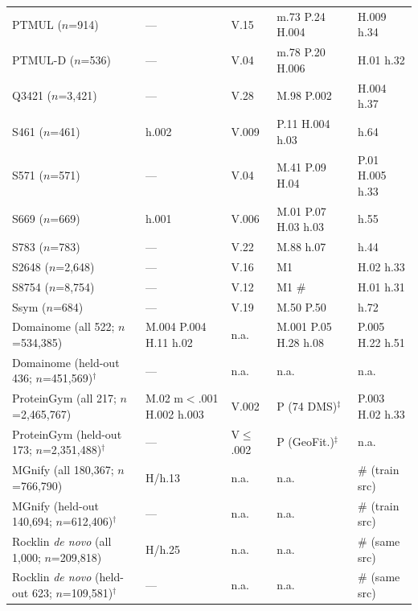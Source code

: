 \begin{table}[H]
{\begin{tabular}{@{}lllll}
        PTMUL ($n$=914) & --- & V.15 & m.73 P.24 H.004 & H.009 h.34 \\
        PTMUL-D ($n$=536) & --- & V.04 & m.78 P.20 H.006 & H.01 h.32 \\
        Q3421 ($n$=3,421) & --- & V.28 & M.98 P.002 & H.004 h.37 \\
        S461 ($n$=461) & h.002 & V.009 & P.11 H.004 h.03 & h.64 \\
        S571 ($n$=571) & --- & V.04 & M.41 P.09 H.04 & P.01 H.005 h.33 \\
        S669 ($n$=669) & h.001 & V.006 & M.01 P.07 H.03 h.03 & h.55 \\
        S783 ($n$=783) & --- & V.22 & M.88 h.07 & h.44 \\
        S2648 ($n$=2,648) & --- & V.16 & M1 & H.02 h.33 \\
        S8754 ($n$=8,754) & --- & V.12 & M1 \# & H.01 h.31 \\
        Ssym ($n$=684) & --- & V.19 & M.50 P.50 & h.72 \\
        \midrule
        Domainome (all 522; $n$=534,385) & M.004 P.004 H.11 h.02 & n.a. & M.001 P.05 H.28 h.08 & P.005 H.22 h.51 \\
        Domainome (held-out 436; $n$=451,569)$^\dagger$ & --- & n.a. & n.a. & n.a. \\
        ProteinGym (all 217; $n$=2,465,767) & M.02 m$<$.001 H.002 h.003 & V.002 & P (74 DMS)$^\ddagger$ & P.003 H.02 h.33 \\
        ProteinGym (held-out 173; $n$=2,351,488)$^\dagger$ & --- & V$\le$.002 & P (GeoFit.)$^\ddagger$ & n.a. \\
        MGnify (all 180,367; $n$=766,790) & H/h.13 & n.a. & n.a. & \# (train src) \\
        MGnify (held-out 140,694; $n$=612,406)$^\dagger$ & --- & n.a. & n.a. & \# (train src) \\
        Rocklin \textit{de novo} (all 1,000; $n$=209,818) & H/h.25 & n.a. & n.a. & \# (same src) \\
        Rocklin \textit{de novo} (held-out 623; $n$=109,581)$^\dagger$ & --- & n.a. & n.a. & \# (same src) \\
    \bottomrule
    \end{tabular}
    }
    \par\bigskip
\end{table}

